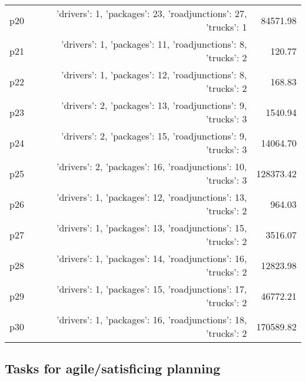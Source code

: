 \documentclass{article}
\begin{document}
\begin{center}
\begin{tabular}{@{}l|r|r@{}}
  p20&{'drivers': 1, 'packages': 23, 'roadjunctions': 27, 'trucks': 1}&84571.98\\
  p21&{'drivers': 1, 'packages': 11, 'roadjunctions': 8, 'trucks': 2}&120.77\\
  p22&{'drivers': 1, 'packages': 12, 'roadjunctions': 8, 'trucks': 2}&168.83\\
  p23&{'drivers': 2, 'packages': 13, 'roadjunctions': 9, 'trucks': 3}&1540.94\\
  p24&{'drivers': 2, 'packages': 15, 'roadjunctions': 9, 'trucks': 3}&14064.70\\
  p25&{'drivers': 2, 'packages': 16, 'roadjunctions': 10, 'trucks': 3}&128373.42\\
  p26&{'drivers': 1, 'packages': 12, 'roadjunctions': 13, 'trucks': 2}&964.03\\
  p27&{'drivers': 1, 'packages': 13, 'roadjunctions': 15, 'trucks': 2}&3516.07\\
  p28&{'drivers': 1, 'packages': 14, 'roadjunctions': 16, 'trucks': 2}&12823.98\\
  p29&{'drivers': 1, 'packages': 15, 'roadjunctions': 17, 'trucks': 2}&46772.21\\
  p30&{'drivers': 1, 'packages': 16, 'roadjunctions': 18, 'trucks': 2}&170589.82
                            \end{tabular}
                            \end{center}
                    

                                \subsection*{Tasks for agile/satisficing planning}
                                
\end{document}
